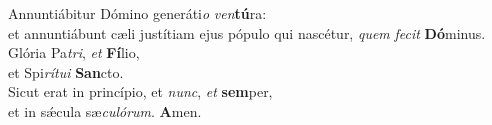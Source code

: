 \evenverse Annuntiábitur Dómino generáti\textit{o} \textit{ven}\textbf{tú}ra:~\*\\
\evenverse et annuntiábunt cæli justítiam ejus pópulo qui nascétur, \textit{quem} \textit{fe}\textit{cit} \textbf{Dó}minus.\\
\oddverse Glória Pa\textit{tri}, \textit{et} \textbf{Fí}lio,~\*\\
\oddverse et Spi\textit{rí}\textit{tu}\textit{i} \textbf{San}cto.\\
\evenverse Sicut erat in princípio, et \textit{nunc}, \textit{et} \textbf{sem}per,~\*\\
\evenverse et in sǽcula sæ\textit{cu}\textit{ló}\textit{rum}. \textbf{A}men.\\
